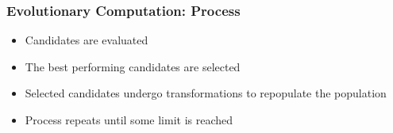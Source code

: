 \documentclass{beamer}
\begin{document}
\begin{frame}
\frametitle{Evolutionary Computation: Process}
 \begin{itemize}
  \item Candidates are evaluated
  \item The best performing candidates are selected
  \item Selected candidates undergo transformations to repopulate the population
  \item Process repeats until some limit is reached
\end{itemize}
\end{frame}

\end{document}
